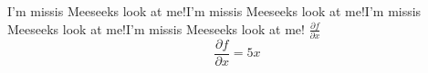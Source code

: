 \documentclass{article}
\newcommand{\lookAtMe}{\vbox{I'm mister Meeseeks look at me!}}
\newcommand{\dfdx}{\ensuremath{\frac{\partial f}{\partial x}}}
\renewcommand{\lookAtMe}{\vbox{I'm missis Meeseeks look at me!}}
\begin{document}
\vspace*{\fill}\vspace{-5ex}

\lookAtMe \lookAtMe \lookAtMe \lookAtMe
\dfdx
$$\dfdx = 5x$$

\vspace*{\fill}
\end{document}
